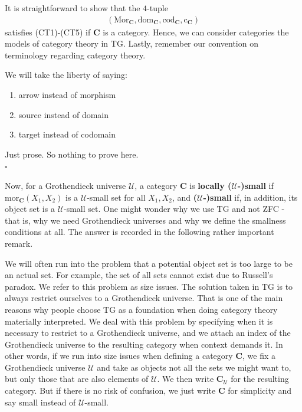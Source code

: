 It is straightforward to show that the $4$-tuple
\begin{align*}
  \left(
    \mathrm{Mor}_{\mathbf{C}},
    \mathrm{dom}_{\mathbf{C}},
    \mathrm{cod}_{\mathbf{C}},
    \mathrm{c}_{\mathbf{C}}
  \right)
\end{align*}
satisfies (CT1)-(CT5) if $\mathbf{C}$ is a category.
Hence, we can consider categories the models of category theory in TG.
Lastly, remember our convention on terminology regarding category theory.
\\
\begin{rem}
\label{rem:cattheoryterm}
We will take the liberty of saying:
\begin{enumerate}
\item[(1)]
arrow instead of morphism
\item[(2)]
source instead of domain
\item[(3)]
target instead of codomain
\end{enumerate}
\end{rem}
\begin{prf}
Just prose.
So nothing to prove here.
\\
\phantom{proven}
\hfill
$\square$
\end{prf}
Now, for a Grothendieck universe $\mathcal{U}$, a category $\mathbf{C}$ is \textbf{locally ($\mathcal{U}$-)small} if $\mathrm{mor}_{\mathbf{C}}(X_{1},X_{2})$ is a $\mathcal{U}$-small set for all $X_{1},X_{2}$, and \textbf{($\mathcal{U}$-)small} if, in addition, its object set is a $\mathcal{U}$-small set.
One might wonder why we use TG and not ZFC - that is, why we need Grothendieck universes and why we define the smallness conditions at all.
The answer is recorded in the following rather important remark.
\\
\begin{rem}
\label{rem:techcat}
We will often run into the problem that a potential object set is too large to be an actual set.
For example, the set of all sets cannot exist due to Russell's paradox.
We refer to this problem as {\glqq}size issues{\grqq}.
The solution taken in TG is to always restrict ourselves to a Grothendieck universe.
That is one of the main reasons why people choose TG as a foundation when doing category theory materially interpreted.
We deal with this problem by specifying when it is necessary to restrict to a Grothendieck universe, and we attach an index of the Grothendieck universe to the resulting category when context demands it.
In other words, if we run into size issues when defining a category $\mathbf{C}$, we fix a Grothendieck universe $\mathcal{U}$ and take as objects not all the sets we might want to, but only those that are also elements of $\mathcal{U}$.
We then write $\mathbf{C}_{\mathcal{U}}$ for the resulting category.
But if there is no risk of confusion, we just write $\mathbf{C}$ for simplicity and say small instead of $\mathcal{U}$-small.
\end{rem}
